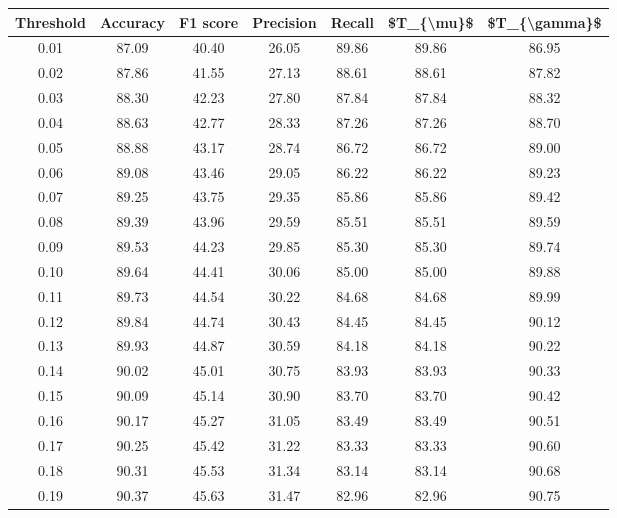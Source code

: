 \begin{tabular}{|c|c|c|c|c|c|c|}
\hline
 Threshold &  Accuracy &  F1 score &  Precision &  Recall &  \$T\_\{\textbackslash mu\}\$ &  \$T\_\{\textbackslash gamma\}\$ \\
\hline
      0.01 &     87.09 &     40.40 &      26.05 &   89.86 &      89.86 &         86.95 \\
      0.02 &     87.86 &     41.55 &      27.13 &   88.61 &      88.61 &         87.82 \\
      0.03 &     88.30 &     42.23 &      27.80 &   87.84 &      87.84 &         88.32 \\
      0.04 &     88.63 &     42.77 &      28.33 &   87.26 &      87.26 &         88.70 \\
      0.05 &     88.88 &     43.17 &      28.74 &   86.72 &      86.72 &         89.00 \\
      0.06 &     89.08 &     43.46 &      29.05 &   86.22 &      86.22 &         89.23 \\
      0.07 &     89.25 &     43.75 &      29.35 &   85.86 &      85.86 &         89.42 \\
      0.08 &     89.39 &     43.96 &      29.59 &   85.51 &      85.51 &         89.59 \\
      0.09 &     89.53 &     44.23 &      29.85 &   85.30 &      85.30 &         89.74 \\
      0.10 &     89.64 &     44.41 &      30.06 &   85.00 &      85.00 &         89.88 \\
      0.11 &     89.73 &     44.54 &      30.22 &   84.68 &      84.68 &         89.99 \\
      0.12 &     89.84 &     44.74 &      30.43 &   84.45 &      84.45 &         90.12 \\
      0.13 &     89.93 &     44.87 &      30.59 &   84.18 &      84.18 &         90.22 \\
      0.14 &     90.02 &     45.01 &      30.75 &   83.93 &      83.93 &         90.33 \\
      0.15 &     90.09 &     45.14 &      30.90 &   83.70 &      83.70 &         90.42 \\
      0.16 &     90.17 &     45.27 &      31.05 &   83.49 &      83.49 &         90.51 \\
      0.17 &     90.25 &     45.42 &      31.22 &   83.33 &      83.33 &         90.60 \\
      0.18 &     90.31 &     45.53 &      31.34 &   83.14 &      83.14 &         90.68 \\
      0.19 &     90.37 &     45.63 &      31.47 &   82.96 &      82.96 &         90.75 \\

\end{tabular}

